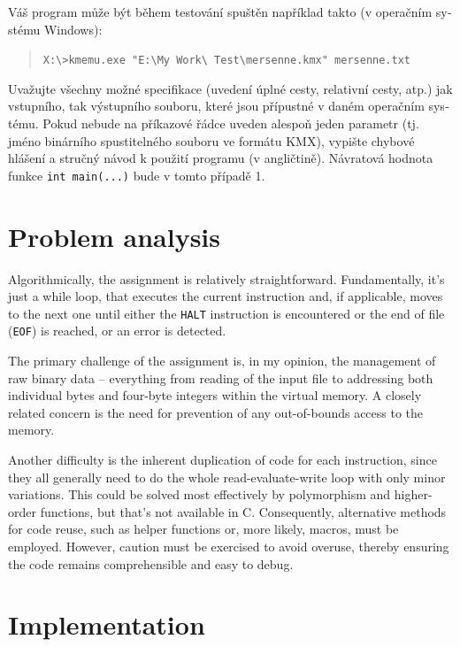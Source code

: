 \documentclass[12pt,a4paper]{paper}
\newcommand{\code}[1]{\texttt{#1}}
\begin{document}
\begin{otherlanguage}{czech}
\begin{enumerate}
\end{enumerate}

Váš program může být během testování spuštěn například takto (v operačním
systému Windows):


\begin{quotation}
\code{X:\textbackslash>kmemu.exe "E:\textbackslash My Work\textbackslash
Test\textbackslash mersenne.kmx"\ mersenne.txt}
\end{quotation}

Uvažujte všechny možné specifikace (uvedení úplné cesty, relativní cesty, atp.)
jak vstupního, tak výstupního souboru, které jsou přípustné v daném operačním
systému. Pokud nebude na příkazové řádce uveden alespoň jeden parametr (tj.
jméno binárního spustitelného souboru ve formátu KMX), vypište chybové hlášení a
stručný návod k použití programu (v angličtině). Návratová hodnota funkce
\code{int main(...)} bude v tomto případě 1.

\end{otherlanguage}

\section{Problem analysis}

Algorithmically, the assignment is relatively straightforward. Fundamentally,
it's just a while loop, that executes the current instruction and, if
applicable, moves to the next one until either the \code{HALT} instruction is
encountered or the end of file (\code{EOF}) is reached, or an error is detected.

The primary challenge of the assignment is, in my opinion, the management of raw
binary data -- everything from reading of the input file to addressing both
individual bytes and four-byte integers within the virtual memory. A closely
related concern is the need for prevention of any out-of-bounds access to the
memory.

Another difficulty is the inherent duplication of code for each instruction,
since they all generally need to do the whole read-evaluate-write loop with only
minor variations. This could be solved most effectively by polymorphism and
higher-order functions, but that's not available in C. Consequently, alternative
methods for code reuse, such as helper functions or, more likely, macros, must
be employed. However, caution must be exercised to avoid overuse, thereby
ensuring the code remains comprehensible and easy to debug.

\section{Implementation}
\end{document}
